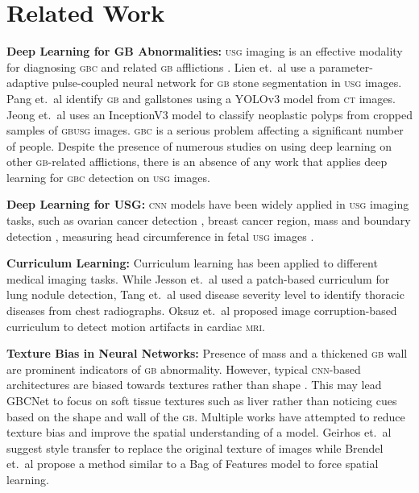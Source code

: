 \documentclass[10pt,twocolumn,letterpaper]{article}
\def\etal{{et.~al}}
\def\cnn{\textsc{cnn}\xspace}
\def\usg{\textsc{usg}\xspace}
\def\gbc{\textsc{gbc}\xspace}
\def\gb{\textsc{gb}\xspace}
\def\mri{\textsc{mri}\xspace}
\def\ct{\textsc{ct}\xspace}
\newcommand{\myfirstpara}[1]{\noindent \textbf{#1:}}
\newcommand{\mypara}[1]{\vspace{0.1em} \myfirstpara{#1}}
\begin{document}
\section{Related Work}

\myfirstpara{Deep Learning for GB Abnormalities}
\usg imaging is an effective modality for diagnosing \gbc and related \gb afflictions \cite{yuan2018gbcManual}. 
Lien \etal \cite{gbAutomatic} use a parameter-adaptive pulse-coupled neural network for \gb stone segmentation in \usg images. Pang \etal \cite{gbYolo} identify \gb and gallstones using a YOLOv3 model from \ct images. Jeong \etal \cite{gbPolyp2} uses an InceptionV3 model to classify neoplastic polyps from cropped samples of \gb \usg images. \gbc is a serious problem affecting a significant number of people. Despite the presence of numerous studies on using deep learning on other \gb-related afflictions, there is an absence of any work that applies deep learning for \gbc detection on \usg images.

\mypara{Deep Learning for USG}
\cnn models have been widely applied in \usg imaging tasks, such as ovarian cancer detection \cite{zhang2019improved}, breast cancer region, mass and boundary detection \cite{bian2017boundary, cao2019BreastLesion, yap2018breast, ning2020multi, zhu2020second}, measuring head circumference in fetal \usg images \cite{sobhaninia2019FetalHC, budd2019FetalHC}. 



\mypara{Curriculum Learning}
Curriculum learning has been applied to different medical imaging tasks. While Jesson \etal \cite{jesson2017cased} used a patch-based curriculum for lung nodule detection, Tang \etal \cite{tang2018attention} used disease severity level to identify thoracic diseases from chest radiographs. Oksuz \etal \cite{oksuz2019automatic} proposed image corruption-based curriculum to detect motion artifacts in cardiac \mri. 

\mypara{Texture Bias in Neural Networks}
Presence of mass and a thickened \gb wall are prominent indicators of \gb abnormality. However, typical \cnn-based architectures are biased towards textures rather than shape \cite{geirhos2018Texture}. This may lead GBCNet to focus on soft tissue textures such as liver rather than noticing cues based on the shape and wall of the \gb. 
Multiple works have attempted to reduce texture bias and improve the spatial understanding of a model. Geirhos \etal \cite{geirhos2018Texture} suggest style transfer to replace the original texture of images while Brendel \etal \cite{brendel2019BagOfFeatures} propose a method similar to a Bag of Features model to force spatial learning. 
\end{document}
